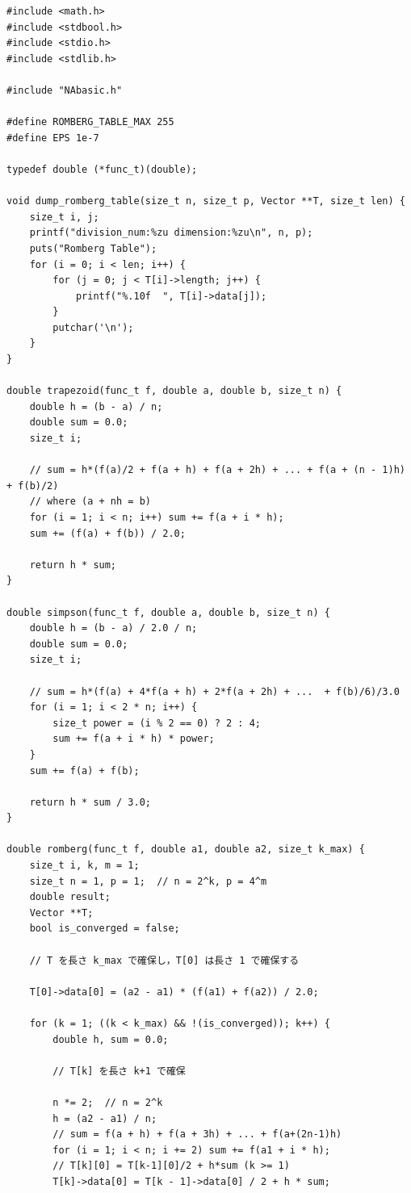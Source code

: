 \documentclass[gutter=20mm,fore-edge=20mm,head_space=30mm,foot_space=30mm]{jlreq}
\begin{document}
\begin{lstlisting}[caption=調査プログラム,label=lst:integral]
#include <math.h>
#include <stdbool.h>
#include <stdio.h>
#include <stdlib.h>

#include "NAbasic.h"

#define ROMBERG_TABLE_MAX 255
#define EPS 1e-7

typedef double (*func_t)(double);

void dump_romberg_table(size_t n, size_t p, Vector **T, size_t len) {
    size_t i, j;
    printf("division_num:%zu dimension:%zu\n", n, p);
    puts("Romberg Table");
    for (i = 0; i < len; i++) {
        for (j = 0; j < T[i]->length; j++) {
            printf("%.10f  ", T[i]->data[j]);
        }
        putchar('\n');
    }
}

double trapezoid(func_t f, double a, double b, size_t n) {
    double h = (b - a) / n;
    double sum = 0.0;
    size_t i;

    // sum = h*(f(a)/2 + f(a + h) + f(a + 2h) + ... + f(a + (n - 1)h) + f(b)/2)
    // where (a + nh = b)
    for (i = 1; i < n; i++) sum += f(a + i * h);
    sum += (f(a) + f(b)) / 2.0;

    return h * sum;
}

double simpson(func_t f, double a, double b, size_t n) {
    double h = (b - a) / 2.0 / n;
    double sum = 0.0;
    size_t i;

    // sum = h*(f(a) + 4*f(a + h) + 2*f(a + 2h) + ...  + f(b)/6)/3.0
    for (i = 1; i < 2 * n; i++) {
        size_t power = (i % 2 == 0) ? 2 : 4;
        sum += f(a + i * h) * power;
    }
    sum += f(a) + f(b);

    return h * sum / 3.0;
}

double romberg(func_t f, double a1, double a2, size_t k_max) {
    size_t i, k, m = 1;
    size_t n = 1, p = 1;  // n = 2^k, p = 4^m
    double result;
    Vector **T;
    bool is_converged = false;

    // T を長さ k_max で確保し，T[0] は長さ 1 で確保する

    T[0]->data[0] = (a2 - a1) * (f(a1) + f(a2)) / 2.0;

    for (k = 1; ((k < k_max) && !(is_converged)); k++) {
        double h, sum = 0.0;

        // T[k] を長さ k+1 で確保

        n *= 2;  // n = 2^k
        h = (a2 - a1) / n;
        // sum = f(a + h) + f(a + 3h) + ... + f(a+(2n-1)h)
        for (i = 1; i < n; i += 2) sum += f(a1 + i * h);
        // T[k][0] = T[k-1][0]/2 + h*sum (k >= 1)
        T[k]->data[0] = T[k - 1]->data[0] / 2 + h * sum;


\end{lstlisting}
\end{document}
